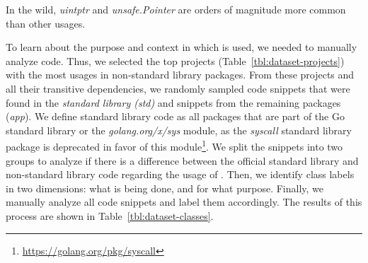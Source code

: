 \begin{tcolorbox}[boxsep=1pt, enlarge top by=5pt, title=Answer to \ref{rq:distTypes}]
In the wild, \textit{uintptr} and \textit{unsafe.Pointer} are orders of magnitude more common than other \unsafe{} usages.
\end{tcolorbox}



To learn about the purpose and context in which \unsafe{} is used, we needed to manually analyze code.
Thus, we selected the top  projects (Table~\ref{tbl:dataset-projects}) with the most \unsafe{} usages in non-standard library packages.
From these projects and all their transitive dependencies, we randomly sampled  code snippets that were found in the \textit{standard library (std)} and  snippets from the remaining packages (\textit{app}).
We define standard library code as all packages that are part of the Go standard library or the \textit{golang.org/x/sys} module, as the \textit{syscall} standard library package is deprecated in favor of this module\footnote{\url{https://golang.org/pkg/syscall}}.
We split the snippets into two groups to analyze if there is a difference between the official standard library and non-standard library code regarding the usage of \unsafe{}.
Then, we identify class labels in two dimensions: what is being done, and for what purpose. 
Finally, we manually analyze all  code snippets and label them accordingly.
The results of this process are shown in Table~\ref{tbl:dataset-classes}.




